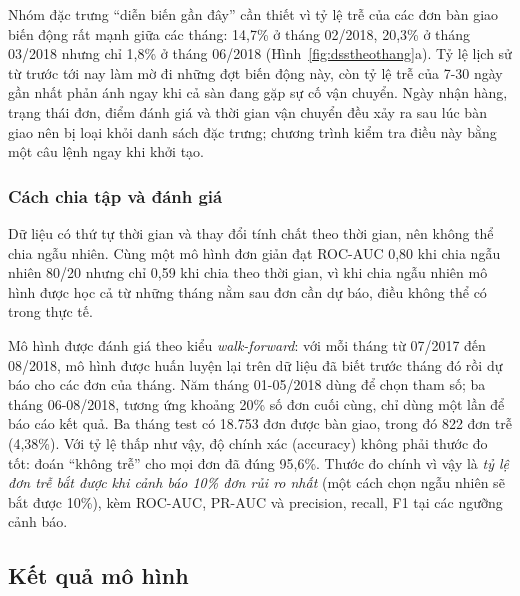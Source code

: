 Nhóm đặc trưng ``diễn biến gần đây'' cần thiết vì tỷ lệ trễ của các đơn bàn giao biến động rất mạnh giữa các tháng: 14,7\% ở tháng 02/2018, 20,3\% ở tháng 03/2018 nhưng chỉ 1,8\% ở tháng 06/2018 (Hình~\ref{fig:dsstheothang}a). Tỷ lệ lịch sử từ trước tới nay làm mờ đi những đợt biến động này, còn tỷ lệ trễ của 7-30 ngày gần nhất phản ánh ngay khi cả sàn đang gặp sự cố vận chuyển. Ngày nhận hàng, trạng thái đơn, điểm đánh giá và thời gian vận chuyển đều xảy ra sau lúc bàn giao nên bị loại khỏi danh sách đặc trưng; chương trình kiểm tra điều này bằng một câu lệnh  ngay khi khởi tạo.

\subsubsection{Cách chia tập và đánh giá}

Dữ liệu có thứ tự thời gian và thay đổi tính chất theo thời gian, nên không thể chia ngẫu nhiên. Cùng một mô hình đơn giản đạt ROC-AUC 0,80 khi chia ngẫu nhiên 80/20 nhưng chỉ 0,59 khi chia theo thời gian, vì khi chia ngẫu nhiên mô hình được học cả từ những tháng nằm sau đơn cần dự báo, điều không thể có trong thực tế.

Mô hình được đánh giá theo kiểu \textit{walk-forward}: với mỗi tháng từ 07/2017 đến 08/2018, mô hình được huấn luyện lại trên dữ liệu đã biết trước tháng đó rồi dự báo cho các đơn của tháng. Năm tháng 01-05/2018 dùng để chọn tham số; ba tháng 06-08/2018, tương ứng khoảng 20\% số đơn cuối cùng, chỉ dùng một lần để báo cáo kết quả. Ba tháng test có 18.753 đơn được bàn giao, trong đó 822 đơn trễ (4,38\%). Với tỷ lệ thấp như vậy, độ chính xác (accuracy) không phải thước đo tốt: đoán ``không trễ'' cho mọi đơn đã đúng 95,6\%. Thước đo chính vì vậy là \textit{tỷ lệ đơn trễ bắt được khi cảnh báo 10\% đơn rủi ro nhất} (một cách chọn ngẫu nhiên sẽ bắt được 10\%), kèm ROC-AUC, PR-AUC và precision, recall, F1 tại các ngưỡng cảnh báo.

\subsection{Kết quả mô hình}\label{sec:dssketqua}


